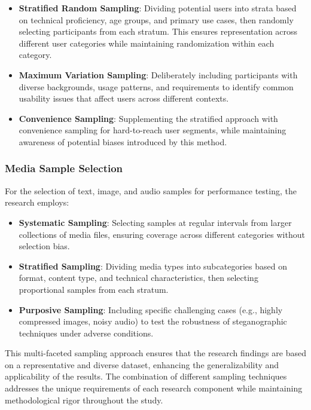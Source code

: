 \documentclass[12pt, a4paper, oneside]{book}
\begin{document}
\begin{itemize}[leftmargin=*]
    \item \textbf{Stratified Random Sampling}: Dividing potential users into strata based on technical proficiency, age groups, and primary use cases, then randomly selecting participants from each stratum. This ensures representation across different user categories while maintaining randomization within each category.

    \item \textbf{Maximum Variation Sampling}: Deliberately including participants with diverse backgrounds, usage patterns, and requirements to identify common usability issues that affect users across different contexts.

    \item \textbf{Convenience Sampling}: Supplementing the stratified approach with convenience sampling for hard-to-reach user segments, while maintaining awareness of potential biases introduced by this method.
\end{itemize}

\subsubsection{Media Sample Selection}
For the selection of text, image, and audio samples for performance testing, the research employs:

\begin{itemize}[leftmargin=*]
    \item \textbf{Systematic Sampling}: Selecting samples at regular intervals from larger collections of media files, ensuring coverage across different categories without selection bias.

    \item \textbf{Stratified Sampling}: Dividing media types into subcategories based on format, content type, and technical characteristics, then selecting proportional samples from each stratum.

    \item \textbf{Purposive Sampling}: Including specific challenging cases (e.g., highly compressed images, noisy audio) to test the robustness of steganographic techniques under adverse conditions.
\end{itemize}

This multi-faceted sampling approach ensures that the research findings are based on a representative and diverse dataset, enhancing the generalizability and applicability of the results. The combination of different sampling techniques addresses the unique requirements of each research component while maintaining methodological rigor throughout the study.
\end{document}
